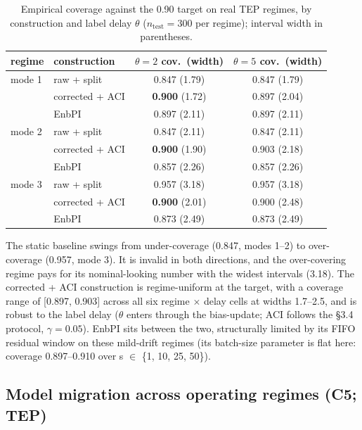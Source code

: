 \begin{table}[t]
\centering\small
\caption{Empirical coverage against the 0.90 target on real TEP regimes, by construction and label delay $\theta$ ($n_{\mathrm{test}}=300$ per regime); interval width in parentheses.}
\label{tab:t2}
\begin{tabular}{@{}llcc@{}}
\toprule
regime & construction & $\theta=2$ cov.\ (width) & $\theta=5$ cov.\ (width) \\
\midrule
mode 1 & raw + split        & 0.847 (1.79) & 0.847 (1.79) \\
       & corrected + ACI    & \textbf{0.900} (1.72) & 0.897 (2.04) \\
       & EnbPI              & 0.897 (2.11) & 0.897 (2.11) \\
\addlinespace
mode 2 & raw + split        & 0.847 (2.11) & 0.847 (2.11) \\
       & corrected + ACI    & \textbf{0.900} (1.90) & 0.903 (2.18) \\
       & EnbPI              & 0.857 (2.26) & 0.857 (2.26) \\
\addlinespace
mode 3 & raw + split        & 0.957 (3.18) & 0.957 (3.18) \\
       & corrected + ACI    & \textbf{0.900} (2.01) & 0.900 (2.48) \\
       & EnbPI              & 0.873 (2.49) & 0.873 (2.49) \\
\bottomrule
\end{tabular}
\end{table}

The static baseline swings from under-coverage (0.847, modes 1--2) to over-coverage
(0.957, mode 3). It is invalid in both directions, and the over-covering regime pays for its
nominal-looking number with the widest intervals (3.18). The corrected + ACI
construction is regime-uniform at the target, with a coverage range of {[}0.897, 0.903{]} across all
six regime $\times$ delay cells at widths 1.7--2.5, and is robust to the label delay ($\theta$
enters through the bias-update; ACI follows the \S 3.4 protocol, $\gamma = 0.05$). EnbPI
sits between the two, structurally limited by its FIFO residual window on these
mild-drift regimes (its batch-size parameter is flat here: coverage 0.897--0.910 over
s $\in$ \{1, 10, 25, 50\}).

\subsection{Model migration across operating regimes (C5; TEP)}

